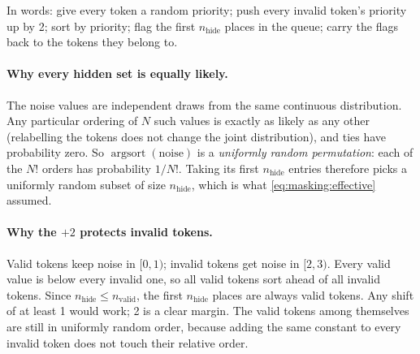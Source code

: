 In words: give every token a random priority; push every invalid token's priority up by 2; sort by
priority; flag the first $n_{\text{hide}}$ places in the queue; carry the flags back to the tokens they
belong to.

\paragraph{Why every hidden set is equally likely.} The noise values are independent draws from the
same continuous distribution. Any particular ordering of $N$ such values is exactly as likely as any
other (relabelling the tokens does not change the joint distribution), and ties have probability zero.
So $\operatorname{argsort}(\text{noise})$ is a \emph{uniformly random permutation}: each of the $N!$
orders has probability $1/N!$. Taking its first $n_{\text{hide}}$ entries therefore picks a uniformly
random subset of size $n_{\text{hide}}$, which is what \cref{eq:masking:effective} assumed.

\paragraph{Why the $+2$ protects invalid tokens.} Valid tokens keep noise in $[0, 1)$; invalid tokens
get noise in $[2, 3)$. Every valid value is below every invalid one, so all valid tokens sort ahead of
all invalid tokens. Since $n_{\text{hide}} \le n_{\text{valid}}$, the first $n_{\text{hide}}$ places
are always valid tokens. Any shift of at least 1 would work; 2 is a clear margin. The valid tokens
among themselves are still in uniformly random order, because adding the same constant to every invalid
token does not touch their relative order.

